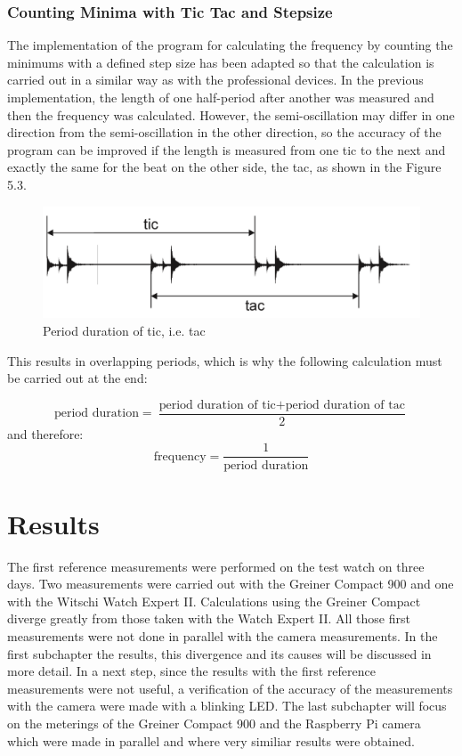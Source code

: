 \documentclass[12pt, a4paper]{report}
\begin{document}
    \subsection{Counting Minima with Tic Tac and Stepsize}
  The implementation of the program for calculating the frequency by counting the minimums with a defined step size has been adapted so that the calculation is carried out in a similar way as with the professional devices. In the previous implementation, the length of one half-period after another was measured and then the frequency was calculated. However, the semi-oscillation may differ in one direction from the semi-oscillation in the other direction, so the accuracy of the program can be improved if the length is measured from one tic to the next and exactly the same for the beat on the other side, the tac, as shown in the Figure 5.3. 
       \noindent
    \begin{figure}[H]
        \centering
        \includegraphics[scale=0.4]{Images/gangdeviation.png}
    
    \caption{Period duration of tic, i.e. tac}
    \end{figure}    
  
  This results in overlapping periods, which is why the following calculation must be carried out at the end:
  
       \begin{displaymath}
     \text{period duration} = \frac{\text{period duration of tic} + \text{period duration of tac}}{2} 
     \end{displaymath}
  and therefore: 
       \begin{displaymath}
      \text{frequency}= \frac{1}{\text{period duration}}
     \end{displaymath}
     
    
    \chapter{Results}
        The first reference measurements were performed on the test watch on three days. Two measurements were carried out with the Greiner Compact 900 and one with the Witschi Watch Expert II. Calculations using the Greiner Compact diverge greatly from those taken with the Watch Expert II. All those first measurements were not done in parallel with the camera measurements. In the first subchapter the results, this divergence and its causes will be discussed in more detail. In a next step, since the results with the first reference measurements were not useful, a verification of the accuracy of the measurements with the camera were made with a blinking LED. The last subchapter will focus on the meterings of the Greiner Compact 900 and the Raspberry Pi camera which were made in parallel and where very similiar results were obtained. 
\end{document}
